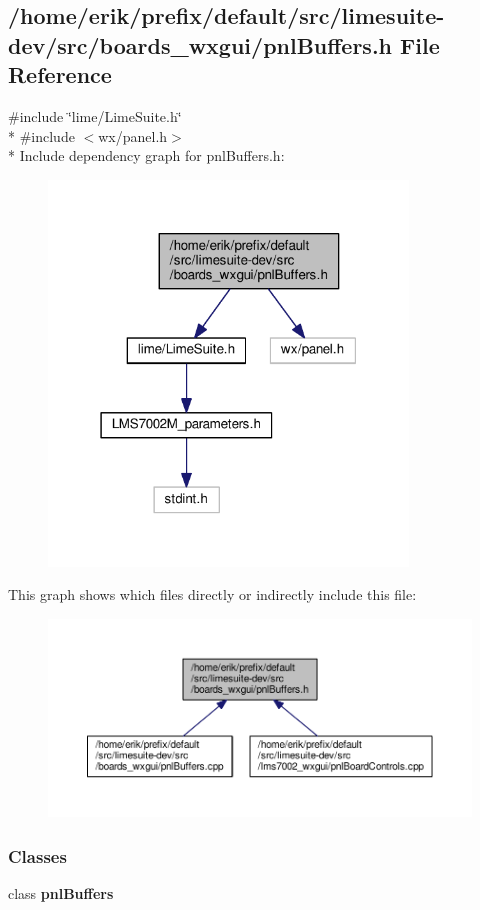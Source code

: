 \subsection{/home/erik/prefix/default/src/limesuite-\/dev/src/boards\+\_\+wxgui/pnl\+Buffers.h File Reference}
\label{pnlBuffers_8h}
{\ttfamily \#include \char`\"{}lime/\+Lime\+Suite.\+h\char`\"{}}\\*
{\ttfamily \#include $<$wx/panel.\+h$>$}\\*
Include dependency graph for pnl\+Buffers.\+h\+:
\nopagebreak
\begin{figure}[H]
\begin{center}
\leavevmode
\includegraphics[width=271pt]{d7/dd3/pnlBuffers_8h__incl}
\end{center}
\end{figure}
This graph shows which files directly or indirectly include this file\+:
\nopagebreak
\begin{figure}[H]
\begin{center}
\leavevmode
\includegraphics[width=350pt]{d0/d7b/pnlBuffers_8h__dep__incl}
\end{center}
\end{figure}
\subsubsection*{Classes}
\begin{DoxyCompactItemize}
\item 
class {\bf pnl\+Buffers}
\end{DoxyCompactItemize}
